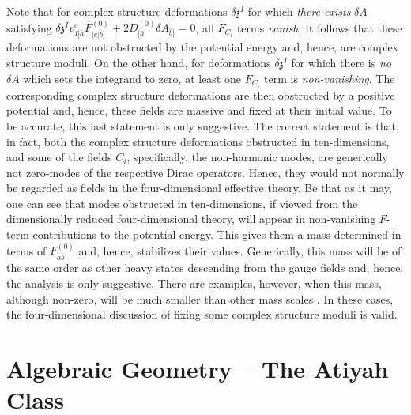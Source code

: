 \documentclass[12pt]{article}
\numberwithin{equation}{section}
\begin{document}
Note that for complex structure deformations $\delta
{\mathfrak{z}}^{I}$ for which {\it there exists} $\delta A$ satisfying
$\delta {\mathfrak{z}}^{I} v_{I [{\bar{a}}}^{c}F_{|c|{\bar{b}}]}^{(0)}
+ 2D^{(0)}_{[{\bar{a}}} \delta A_{{\bar{b}}]}=0$, all $F_{C_i}$ terms {\it vanish}. It follows that these
deformations are not obstructed by the potential energy and, hence,
are complex structure moduli.  On the other hand, for deformations
$\delta {\mathfrak{z}}^{I}$ for which there is {\it no} $\delta A$
which sets the integrand to zero, at least one $F_{C_i}$
term is {\it non-vanishing}. The corresponding complex structure
deformations are then obstructed by a positive potential and, hence,
these fields are massive and fixed at their initial value.  To be
accurate, this last statement is only suggestive. The correct
statement is that, in fact, both the complex structure deformations
obstructed in ten-dimensions, and some of the fields $C_i$, specifically, the non-harmonic modes, are generically not
zero-modes of the respective Dirac operators. Hence, they would not
normally be regarded as fields in the four-dimensional effective
theory. Be that as it may, one can see that modes obstructed in
ten-dimensions, if viewed from the dimensionally reduced
four-dimensional theory, will appear in non-vanishing $F$-term
contributions to the potential energy. This gives them a mass
determined in terms of $F^{(0)}_{a\bar{b}}$ and, hence, stabilizes their
values. Generically, this mass will be of the same order as other
heavy states descending from the gauge fields and, hence, the analysis
is only suggestive. There are examples, however, when this mass,
although non-zero, will be much smaller than other mass scales \cite{big_paper}.
In these cases, the four-dimensional discussion of fixing
some complex structure moduli is valid.




\section{Algebraic Geometry -- The Atiyah Class}\label{atiyah_sec}
\end{document}
